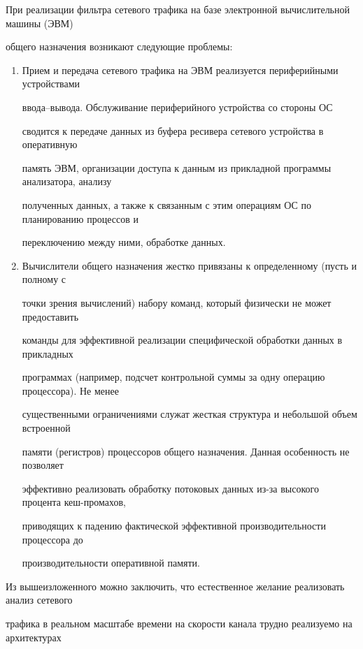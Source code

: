 При реализации фильтра сетевого трафика на базе электронной вычислительной машины (ЭВМ) 


общего назначения возникают следующие  проблемы:


\begin{enumerate}[1.]


\item Прием и передача сетевого трафика на ЭВМ реализуется периферийными устройствами 


вво\-да--вы\-во\-да. Обслуживание периферийного устройства со стороны ОС 


сводится к передаче данных из буфера ресивера сетевого устройства в оперативную 


память ЭВМ, организации доступа к данным из прикладной программы анализатора, анализу 


полученных данных, а также к связанным с этим операциям ОС по планированию процессов и 


переключению между ними, обработке данных.


\item Вычислители общего назначения жестко привязаны к определенному (пусть и полному с 


точки зрения вычислений) набору команд, который физически не может предоставить 


команды для эффективной реализации специфической обработки данных в прикладных 


программах (например, подсчет контрольной суммы за одну операцию процессора). Не менее 


существенными ограничениями служат жесткая структура и небольшой объем встроенной 


памяти (регистров) процессоров общего назначения. Данная особенность не позволяет 


эффективно реализовать обработку потоковых данных из-за высокого процента кеш-промахов, 


приводящих к падению фактической эффективной производительности процессора до 


производительности оперативной памяти.


\end{enumerate}





Из вышеизложенного можно заключить, что естественное желание реализовать анализ сетевого 


трафика в реальном масштабе времени на скорости канала трудно реализуемо на архитектурах 



